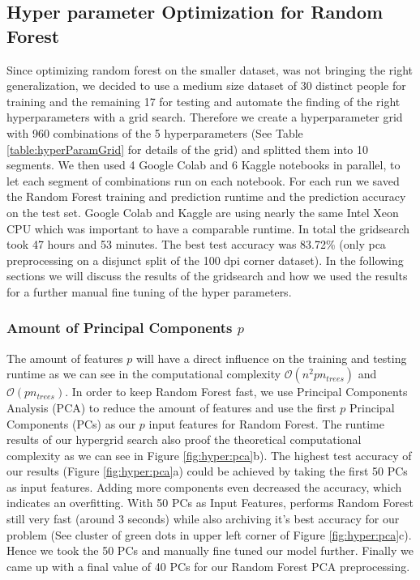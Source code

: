 \documentclass[conference]{IEEEtran}
\begin{document}
\subsection{Hyper parameter Optimization for Random Forest}\label{sec:hyper:rf}
\textcolor{til}{
    Since optimizing random forest on the smaller dataset, was not bringing the right generalization, we decided to use a medium size dataset of 30 distinct people for training and the remaining 17 for testing and automate the finding of the right hyperparameters with a grid search. Therefore we create a hyperparameter grid with 960 combinations of the 5 hyperparameters (See Table \ref{table:hyperParamGrid} for details of the grid) and splitted them into 10 segments. We then used 4 Google Colab and 6 Kaggle notebooks in parallel, to let each segment of combinations run on each notebook. For each run we saved the Random Forest training and prediction runtime and the prediction accuracy on the test set. Google Colab and Kaggle are using nearly the same Intel Xeon CPU which was important to have a comparable runtime. In total the gridsearch took 47 hours and 53 minutes. The best test accuracy was 83.72\% (only pca preprocessing on a disjunct split of the 100 dpi corner dataset). In the following sections we will discuss the results of the gridsearch and how we used the results for a further manual fine tuning of the hyper parameters. 
    \subsubsection{Amount of Principal Components $p$}
    The amount of features $p$ will have a direct influence on the training and testing runtime as we can see in the computational complexity $\mathcal{O}(n^2pn_{trees})$ and $\mathcal{O}(pn_{trees})$. In order to keep Random Forest fast, we use Principal Components Analysis (PCA) to reduce the amount of features and use the first $p$ Principal Components (PCs) as our $p$ input features for Random Forest. The runtime results of our hypergrid search also proof the theoretical computational complexity as we can see in Figure \ref{fig:hyper:pca}b). The highest test accuracy of our results (Figure \ref{fig:hyper:pca}a) could be achieved by taking the first 50 PCs as input features. Adding more components even decreased the accuracy, which indicates an overfitting. With 50 PCs as Input Features, performs Random Forest still very fast (around 3 seconds) while also archiving it's best accuracy for our problem (See cluster of green dots in upper left corner of Figure \ref{fig:hyper:pca}c). Hence we took the 50 PCs and manually fine tuned our model further. Finally we came up with a final value of 40 PCs for our Random Forest PCA preprocessing.
}
\end{document}
